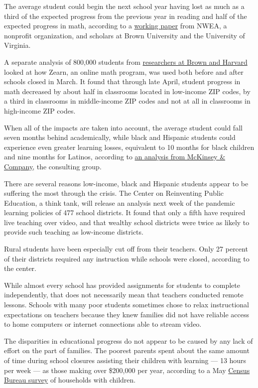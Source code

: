 The average student could begin the next school year having lost as much
as a third of the expected progress from the previous year in reading
and half of the expected progress in math, according to a
\href{https://www.edworkingpapers.com/ai20-226}{working paper} from
NWEA, a nonprofit organization, and scholars at Brown University and the
University of Virginia.

A separate analysis of 800,000 students from
\href{https://tracktherecovery.org/}{researchers at Brown and Harvard}
looked at how Zearn, an online math program, was used both before and
after schools closed in March. It found that through late April, student
progress in math decreased by about half in classrooms located in
low-income ZIP codes, by a third in classrooms in middle-income ZIP
codes and not at all in classrooms in high-income ZIP codes.

When all of the impacts are taken into account, the average student
could fall seven months behind academically, while black and Hispanic
students could experience even greater learning losses, equivalent to 10
months for black children and nine months for Latinos, according to
\href{https://www.mckinsey.com/industries/public-sector/our-insights/covid-19-and-student-learning-in-the-united-states-the-hurt-could-last-a-lifetime}{an
analysis from McKinsey \& Company}, the consulting group.

There are several reasons low-income, black and Hispanic students appear
to be suffering the most through the crisis. The Center on Reinventing
Public Education, a think tank, will release an analysis next week of
the pandemic learning policies of 477 school districts. It found that
only a fifth have required live teaching over video, and that wealthy
school districts were twice as likely to provide such teaching as
low-income districts.

Rural students have been especially cut off from their teachers. Only 27
percent of their districts required any instruction while schools were
closed, according to the center.

While almost every school has provided assignments for students to
complete independently, that does not necessarily mean that teachers
conducted remote lessons. Schools with many poor students sometimes
chose to relax instructional expectations on teachers because they knew
families did not have reliable access to home computers or internet
connections able to stream video.

The disparities in educational progress do not appear to be caused by
any lack of effort on the part of families. The poorest parents spent
about the same amount of time during school closures assisting their
children with learning --- 13 hours per week --- as those making over
\$200,000 per year, according to a May
\href{https://www.census.gov/data/tables/2020/demo/hhp2.html}{Census
Bureau survey} of households with children.

